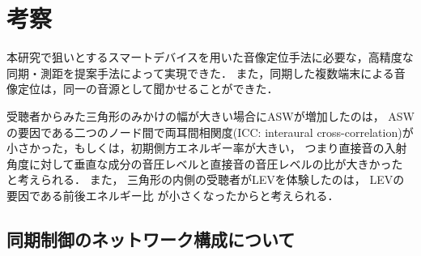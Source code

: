 \chapter{考察}

本研究で狙いとするスマートデバイスを用いた音像定位手法に必要な，高精度な同期・測距を提案手法によって実現できた．
また，同期した複数端末による音像定位は，同一の音源として聞かせることができた．

受聴者からみた三角形のみかけの幅が大きい場合にASWが増加したのは，
ASWの要因である二つのノード間で両耳間相関度(ICC: interaural cross-correlation)が
小さかった\cite{morimoto95}，もしくは，初期側方エネルギー率が大きい，
つまり直接音の入射角度に対して垂直な成分の音圧レベルと直接音の音圧レベルの比が大きかった\cite{barron81}
と考えられる．
また，
三角形の内側の受聴者がLEVを体験したのは，
LEVの要因である前後エネルギー比\cite{suehiro06}
が小さくなったからと考えられる．




\section{同期制御のネットワーク構成について}

